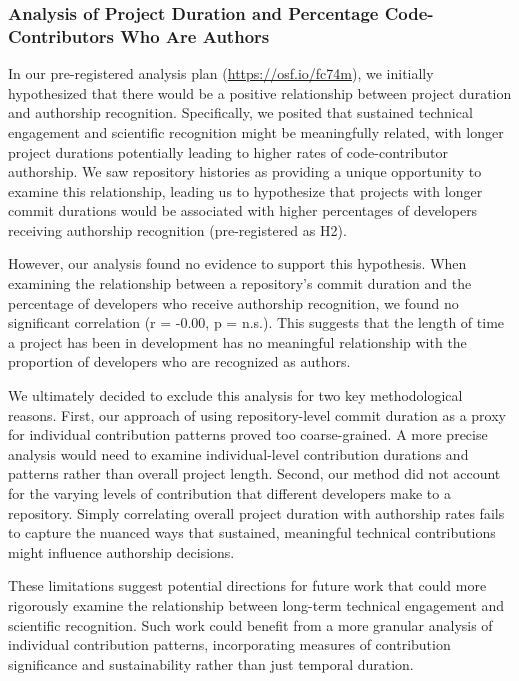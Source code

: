 \documentclass[
  letterpaper,
  DIV=11,
  numbers=noendperiod]{scrartcl}
\begin{document}
\subsubsection{Analysis of Project Duration and Percentage
Code-Contributors Who Are
Authors}\label{analysis-of-project-duration-and-percentage-code-contributors-who-are-authors}

In our pre-registered analysis plan (\url{https://osf.io/fc74m}), we
initially hypothesized that there would be a positive relationship
between project duration and authorship recognition. Specifically, we
posited that sustained technical engagement and scientific recognition
might be meaningfully related, with longer project durations potentially
leading to higher rates of code-contributor authorship. We saw
repository histories as providing a unique opportunity to examine this
relationship, leading us to hypothesize that projects with longer commit
durations would be associated with higher percentages of developers
receiving authorship recognition (pre-registered as H2).

However, our analysis found no evidence to support this hypothesis. When
examining the relationship between a repository's commit duration and
the percentage of developers who receive authorship recognition, we
found no significant correlation (r = -0.00, p = n.s.). This suggests
that the length of time a project has been in development has no
meaningful relationship with the proportion of developers who are
recognized as authors.

We ultimately decided to exclude this analysis for two key
methodological reasons. First, our approach of using repository-level
commit duration as a proxy for individual contribution patterns proved
too coarse-grained. A more precise analysis would need to examine
individual-level contribution durations and patterns rather than overall
project length. Second, our method did not account for the varying
levels of contribution that different developers make to a repository.
Simply correlating overall project duration with authorship rates fails
to capture the nuanced ways that sustained, meaningful technical
contributions might influence authorship decisions.

These limitations suggest potential directions for future work that
could more rigorously examine the relationship between long-term
technical engagement and scientific recognition. Such work could benefit
from a more granular analysis of individual contribution patterns,
incorporating measures of contribution significance and sustainability
rather than just temporal duration.
\end{document}
